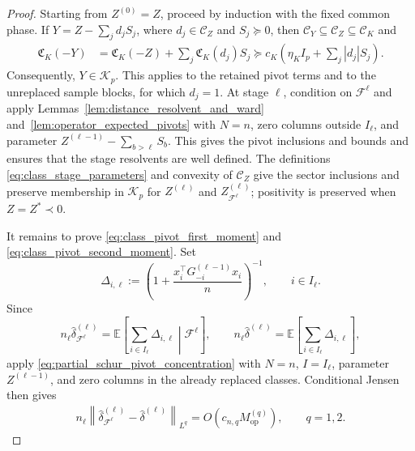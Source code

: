 \documentclass[EJP, preprint, NODS, nobera, nofontexpansion]{ejpecp}
\DeclareMathOperator{\op}{op}
\begin{document}
\begin{proof}
Starting from \(Z^{(0)}=Z\), proceed by induction with the fixed common
phase. If \(Y=Z-\sum_j d_jS_j\), where
\(d_j\in\mathcal C_Z\) and \(S_j\succeq0\), then
\(\mathcal C_Y\subseteq\mathcal C_Z\subseteq\mathcal C_K\) and
\begin{align*}
    \mathfrak C_K(-Y)
    &=\mathfrak C_K(-Z)
      +\sum_j\mathfrak C_K(d_j)S_j
    \succeq c_K
      \left(\eta_KI_p+\sum_j|d_j|S_j\right).
\end{align*}
Consequently, \(Y\in\mathcal K_p\). This applies to the retained pivot
terms and to the unreplaced sample blocks, for which \(d_j=1\).
At stage \(\ell\), condition on \(\mathcal F^{\ell}\) and apply
Lemmas~\ref{lem:distance_resolvent_and_ward}
and~\ref{lem:operator_expected_pivots} with \(N=n\),
zero columns outside \(I_{\ell}\), and parameter
\(Z^{(\ell-1)}-\sum_{b>\ell}S_b\).
This gives the pivot inclusions and bounds and ensures that the
stage resolvents are well defined.
The definitions \eqref{eq:class_stage_parameters} and convexity of
\(\mathcal C_Z\) give the sector inclusions and preserve
membership in \(\mathcal K_p\) for \(Z^{(\ell)}\) and
\(Z_{\mathcal F^{\ell}}^{(\ell)}\);
positivity is preserved when \(Z=Z^*\prec0\).

It remains to prove \eqref{eq:class_pivot_first_moment} and
\eqref{eq:class_pivot_second_moment}. Set
\[
    \Delta_{i,\ell}
    :=
    \left(
        1+\frac{x_i^\top G_{-i}^{(\ell-1)}x_i}{n}
    \right)^{-1},
    \qquad i\in I_{\ell}.
\]
Since
\[
    n_{\ell}\widehat\delta_{\mathcal F^{\ell}}^{(\ell)}
    =
    \mathbb E\!\left[
        \sum_{i\in I_{\ell}}\Delta_{i,\ell}
        \middle|\mathcal F^{\ell}
    \right],
    \qquad
    n_{\ell}\widehat\delta^{(\ell)}
    =
    \mathbb E\!\left[
        \sum_{i\in I_{\ell}}\Delta_{i,\ell}
    \right],
\]
apply \eqref{eq:partial_schur_pivot_concentration} with \(N=n\),
\(I=I_{\ell}\), parameter \(Z^{(\ell-1)}\), and zero columns in the
already replaced classes. Conditional Jensen then gives
\begin{align}
\label{eq:class_pivot_coarse_bound}
    n_{\ell}
    \left\|
        \widehat\delta_{\mathcal F^{\ell}}^{(\ell)}
        -
        \widehat\delta^{(\ell)}
    \right\|_{L^q}
    =
    O\!\left(
        c_{n,q}M_{\op}^{(q)}
    \right),
    \qquad q=1,2.
\end{align}


\end{proof}
\end{document}

